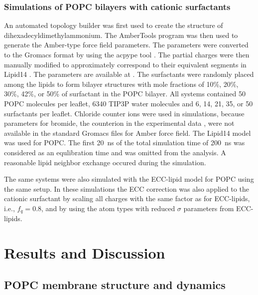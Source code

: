 \documentclass[aip,jcp,twocolumn]{revtex4}
\begin{document}
\subsubsection{Simulations of POPC bilayers with cationic surfactants}
An automated topology builder \cite{malde11} was first used to create the structure of
dihexadecyldimethylammonium.%
The AmberTools program \cite{amber} was then used to generate the Amber-type force field
parameters. The parameters were converted to the Gromacs format by using
the acpype tool \cite{acpype}. The partial charges were then manually modified
to approximately correspond to their equivalent segments in Lipid14 \cite{dickson14}.
The parameters are available at \cite{??} .
The surfactants were randomly placed among the lipids to form bilayer structures with
mole fractions of 10\%, 20\%, 30\%, 42\%, or 50\% of surfactant in the POPC bilayer.
All systems contained 50 POPC molecules per leaflet, 6340 TIP3P water molecules and
6, 14, 21, 35, or 50 surfactants per leaflet. Chloride counter ions were used
in simulations, because parameters for bromide, the counterion in the experimental data \cite{scherer89},
were not available in the standard Gromacs files for Amber force field.
The Lipid14 model was used for POPC.
The first 20~ns of the total simulation time of 200~ns
was considered as an equlibration time and was omitted from the analysis.
A reasonable lipid neighbor exchange occured during the simulation.


The same systems were also simulated with the ECC-lipid model for POPC using the same setup.
In these simulations the ECC correction was also applied to the cationic surfactant 
by scaling all charges with the same factor as for ECC-lipids, i.e., $f_q=0.8$, 
and by using the atom types with reduced $\sigma$ parameters from ECC-lipids. 


\section{Results and Discussion}

\subsection{POPC membrane structure and dynamics}
\end{document}
